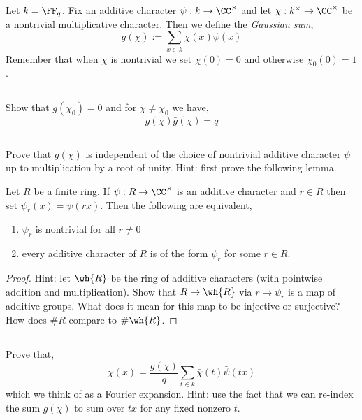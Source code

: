 \documentclass[12pt]{article}
\begin{document}
Let $k = \FF_q$. Fix an additive character $\psi : k \to \CC^\times$ and let $\chi :  k^\times \to \CC^\times$ be a nontrivial multiplicative character. Then we define the \textit{Gaussian sum},
\[ g(\chi) := \sum_{x \in k} \chi(x) \psi(x) \]
Remember that when $\chi$ is nontrivial we set $\chi(0) = 0$ and otherwise $\chi_0(0) = 1$. 

\subsection{}

Show that $g(\chi_0) = 0$ and for $\chi \neq \chi_0$ we have,
\[ g(\chi) \bar{g}(\chi) = q \]

\subsection{}

Prove that $g(\chi)$ is independent of the choice of nontrivial additive character $\psi$ up to multiplication by a root of unity. Hint: first prove the following lemma.

\begin{lemma}
Let $R$ be a finite ring. If $\psi : R \to \CC^\times$ is an additive character and $r \in R$ then set $\psi_r(x) = \psi(rx)$. Then the following are equivalent,
\begin{enumerate}
\item $\psi_r$ is nontrivial for all $r \neq 0$
\item every additive character of $R$ is of the form $\psi_r$ for some $r \in R$.
\end{enumerate}
\end{lemma} 

\begin{proof}
Hint: let $\wh{R}$ be the ring of additive characters (with pointwise addition and multiplication). Show that $R \to \wh{R}$ via $r \mapsto \psi_r$ is a map of additive groups. What does it mean for this map to be injective or surjective? How does $\# R$ compare to $\# \wh{R}$.
\end{proof}

\subsection{}

Prove that,
\[ \chi(x) = \frac{g(\chi)}{q} \sum_{t \in k} \bar{\chi}(t) \bar{\psi}(tx) \]
which we think of as a Fourier expansion. Hint: use the fact that we can re-index the sum $g(\chi)$ to sum over $t x$ for any fixed nonzero $t$.
\end{document}
